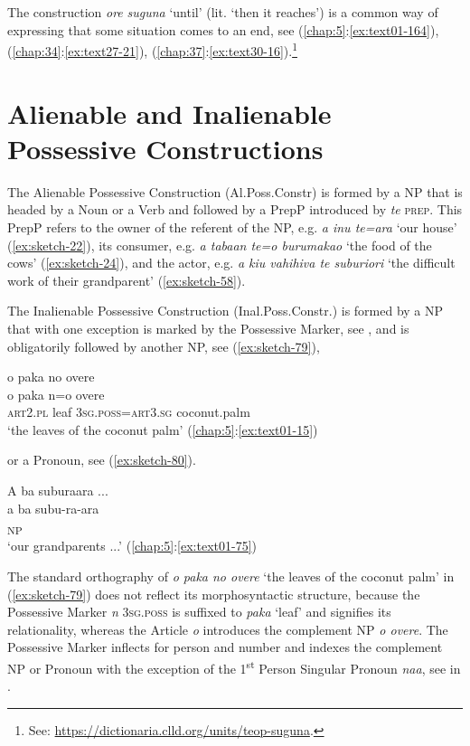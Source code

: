 \documentclass[output=paper]{langscibook}
\begin{document}
The construction \textit{ore} \textit{suguna} `until' (lit. `then it reaches') is a common way of expressing that some situation comes to an end, see (\ref{chap:5}:\ref{ex:text01-164}), (\ref{chap:34}:\ref{ex:text27-21}), (\ref{chap:37}:\ref{ex:text30-16}).\footnote{See: \url{https://dictionaria.clld.org/units/teop-suguna}.} 

\section{Alienable and Inalienable Possessive Constructions}\label{sec:posscon}

The Alienable Possessive Construction (Al.Poss.Constr) is formed by a NP that is headed by a Noun or a Verb and followed by a PrepP introduced by \textit{te} \textsc{prep}. This PrepP refers to the owner of the referent of the NP, e.g. \textit{a inu te=ara} `our house' (\ref{ex:sketch-22}), its consumer, e.g. \textit{a tabaan te=o burumakao} `the food of the cows' (\ref{ex:sketch-24}), and the actor, e.g. \textit{a kiu vahihiva te suburiori} `the difficult work of their grandparent' (\ref{ex:sketch-58}).

The Inalienable Possessive Construction (Inal.Poss.Constr.) is formed by a NP that with one exception  is marked by the Possessive Marker, see , and is obligatorily followed by another NP, see (\ref{ex:sketch-79}),

\ea\label{ex:sketch-79}
    o paka no overe\\
    \gll o paka n=o overe\\
    \textsc{art}2.\textsc{pl} leaf 3\textsc{sg}.\textsc{poss}=\textsc{art}3.\textsc{sg} coconut.palm\\
    \glt `the leaves of the coconut palm' (\ref{chap:5}:\ref{ex:text01-15})
\z

\noindent or a Pronoun, see (\ref{ex:sketch-80}).

\ea\label{ex:sketch-80}
    A ba suburaara ...\\
    \gll a	ba	subu-ra-ara\\
    [\textsc{art}2.\textsc{sg}	\textsc{kin}.\textsc{plm}	grandparent-1\textsc{pl}.\textsc{in}.\textsc{poss}-1\textsc{pl}.\textsc{in}.\textsc{pron}]\textsubscript{NP}\\
    \glt `our grandparents ...' (\ref{chap:5}:\ref{ex:text01-75})
\z

The standard orthography of \textit{o paka no overe} `the leaves of the coconut palm' in (\ref{ex:sketch-79}) does not reflect its morphosyntactic structure, because the Possessive Marker \textit{n} 3\textsc{sg}.\textsc{poss} is suffixed to \textit{paka} `leaf' and signifies its relationality, whereas the Article \textit{o} introduces the complement NP \textit{o overe}. The Possessive Marker inflects for person and number and indexes the complement NP or Pronoun with the exception of the 1\textsuperscript{st} Person Singular Pronoun \textit{naa}, see  in .
\end{document}
